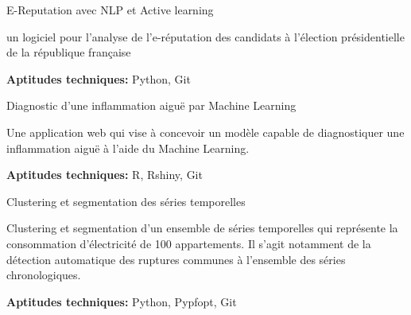 

    \proj
    {E-Reputation avec NLP et Active learning} 
    {} 
    {
      \begin{cvitems} %
        \item[\ding{32}]  un logiciel pour l’analyse de l’e-réputation des candidats à l’élection présidentielle de la république française
        \item {\textbf{Aptitudes techniques:} Python, Git}
      \end{cvitems}
      }

  \proj
    {Diagnostic d'une inflammation aiguë par Machine Learning} 
    {} 
    {
      \begin{cvitems} %
        \item[\ding{32}]  Une application web qui vise à concevoir un modèle capable de diagnostiquer une inflammation aiguë  à l'aide du Machine Learning.  
        \item {\textbf{Aptitudes techniques:} R, Rshiny, Git}
      \end{cvitems}
      }
      
     \proj
    {Clustering et segmentation des séries temporelles} 
    {} 
    {
      \begin{cvitems} %
        \item[\ding{32}]  Clustering et segmentation d’un ensemble de séries temporelles qui représente la consommation d’électricité de 100 appartements. Il s'agit notamment de la détection automatique des ruptures communes à l'ensemble des séries chronologiques.  
        \item {\textbf{Aptitudes techniques:} Python, Pypfopt, Git \\}
      \end{cvitems}
      }